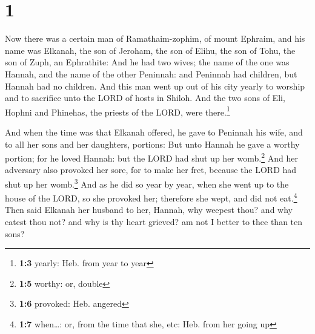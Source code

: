 \hypertarget{section}{%
\section{1}\label{section}}

 Now there was a certain man of Ramathaim-zophim, of mount
Ephraim, and his name was Elkanah, the son of Jeroham, the son of Elihu,
the son of Tohu, the son of Zuph, an Ephrathite:  And he
had two wives; the name of the one was Hannah, and the name of the other
Peninnah: and Peninnah had children, but Hannah had no children.
 And this man went up out of his city yearly to worship
and to sacrifice unto the LORD of hosts in Shiloh. And the two sons of
Eli, Hophni and Phinehas, the priests of the LORD, were
there.\footnote{\textbf{1:3} yearly: Heb. from year to year}

 And when the time was that Elkanah offered, he gave to
Peninnah his wife, and to all her sons and her daughters, portions:
 But unto Hannah he gave a worthy portion; for he loved
Hannah: but the LORD had shut up her womb.\footnote{\textbf{1:5} worthy:
  or, double}  And her adversary also provoked her sore,
for to make her fret, because the LORD had shut up her womb.\footnote{\textbf{1:6}
  provoked: Heb. angered}  And as he did so year by year,
when she went up to the house of the LORD, so she provoked her;
therefore she wept, and did not eat.\footnote{\textbf{1:7} when\ldots:
  or, from the time that she, etc: Heb. from her going up}
 Then said Elkanah her husband to her, Hannah, why weepest
thou? and why eatest thou not? and why is thy heart grieved? am not I
better to thee than ten sons?

